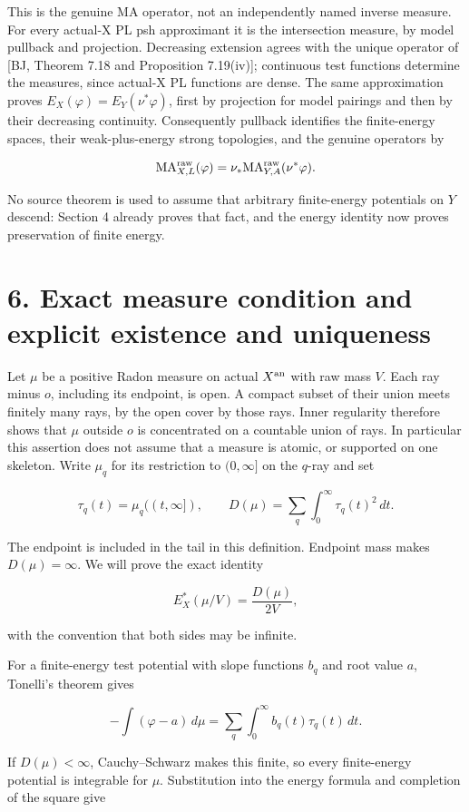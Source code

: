 \documentclass[11pt]{article}
\begin{document}
This is the genuine MA operator, not an independently named inverse measure. For every actual-X PL psh approximant it is the intersection measure, by model pullback and projection. Decreasing extension agrees with the unique operator of [BJ, Theorem 7.18 and Proposition 7.19(iv)]; continuous test functions determine the measures, since actual-X PL functions are dense. The same approximation proves $E_X(\varphi)=E_Y(\nu^*\varphi)$, first by projection for model pairings and then by their decreasing continuity. Consequently pullback identifies the finite-energy spaces, their weak-plus-energy strong topologies, and the genuine operators by

\[
 \mathrm{MA}^{\rm raw}_{X,L}(\varphi)=
 \nu_*\mathrm{MA}^{\rm raw}_{Y,A}(\nu^*\varphi).
\]

No source theorem is used to assume that arbitrary finite-energy potentials on $Y$ descend: Section 4 already proves that fact, and the energy identity now proves preservation of finite energy.

\section*{6. Exact measure condition and explicit existence and uniqueness}
Let $\mu$ be a positive Radon measure on actual $X^{\rm an}$ with raw mass $V$. Each ray minus $o$, including its endpoint, is open. A compact subset of their union meets finitely many rays, by the open cover by those rays. Inner regularity therefore shows that $\mu$ outside $o$ is concentrated on a countable union of rays. In particular this assertion does not assume that a measure is atomic, or supported on one skeleton. Write $\mu_q$ for its restriction to $(0,\infty]$ on the $q$-ray and set

\[
 \tau_q(t)=\mu_q((t,\infty]),\qquad
 D(\mu)=\sum_q\int_0^\infty\tau_q(t)^2\,dt.
\]

The endpoint is included in the tail in this definition. Endpoint mass makes $D(\mu)=\infty$. We will prove the exact identity

\[
 E_X^*(\mu/V)=\frac{D(\mu)}{2V},
\]

with the convention that both sides may be infinite.

For a finite-energy test potential with slope functions $b_q$ and root value $a$, Tonelli's theorem gives

\[
 -\int(\varphi-a)\,d\mu
 =\sum_q\int_0^\infty b_q(t)\tau_q(t)\,dt.
\]

If $D(\mu)<\infty$, Cauchy--Schwarz makes this finite, so every finite-energy potential is integrable for $\mu$. Substitution into the energy formula and completion of the square give
\end{document}
